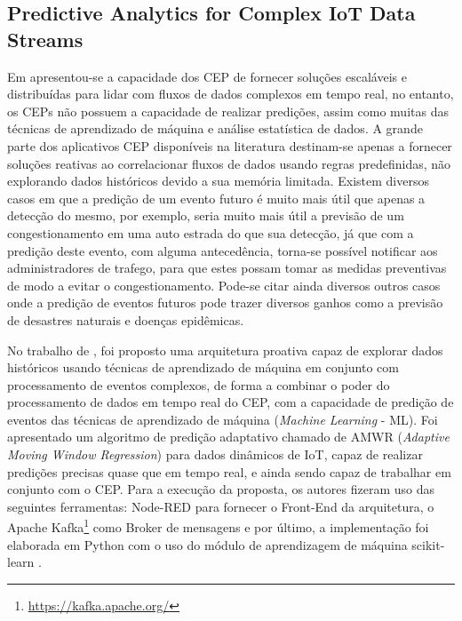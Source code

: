\documentclass[ti,table]{texufpel} %
\begin{document}
\subsection{Predictive Analytics for Complex IoT Data Streams} 

  

  

    Em \cite{art4akbar2017predictive} apresentou-se a capacidade dos CEP de fornecer soluções escaláveis e distribuídas para lidar com fluxos de dados complexos em tempo real, no entanto, os CEPs  não possuem a capacidade de realizar predições, assim como muitas das técnicas de aprendizado de máquina e análise estatística de dados. A grande parte dos aplicativos CEP disponíveis na literatura destinam-se apenas a fornecer soluções reativas ao correlacionar fluxos de dados usando regras predefinidas, não explorando dados históricos devido a sua memória limitada. Existem diversos casos em que a predição de um evento futuro é muito mais útil que apenas a detecção do mesmo, por exemplo, seria muito mais útil a previsão de um congestionamento em uma auto estrada do que sua detecção, já que com a predição deste evento, com alguma antecedência, torna-se possível notificar aos administradores de trafego, para que estes possam tomar as medidas preventivas de modo a evitar o congestionamento. Pode-se citar ainda diversos outros casos onde a predição de eventos futuros pode trazer diversos ganhos como a previsão de desastres naturais e doenças epidêmicas.  

     

     No trabalho de \cite{art4akbar2017predictive}, foi proposto uma arquitetura proativa capaz de explorar dados históricos usando técnicas de aprendizado de máquina em conjunto com processamento de eventos complexos, de forma a combinar o poder do processamento de dados em tempo real do CEP, com a capacidade de predição de eventos das técnicas de aprendizado de máquina (\textit{Machine Learning} - ML). Foi apresentado um algoritmo de predição adaptativo chamado de AMWR (\textit{Adaptive Moving Window Regression}) para dados dinâmicos de IoT, capaz de realizar predições precisas quase que em tempo real, e ainda sendo capaz de trabalhar em conjunto com o CEP. Para a execução da proposta, os autores fizeram uso das seguintes ferramentas: Node-RED para fornecer o Front-End da arquitetura, o Apache Kafka\footnote{\url{https://kafka.apache.org/}} como Broker de mensagens e por último, a implementação foi elaborada em Python com o uso do módulo de aprendizagem de máquina scikit-learn .   
\end{document}
